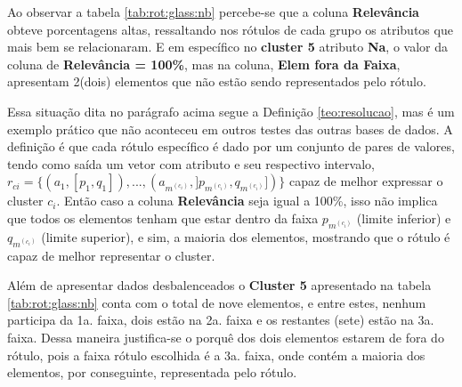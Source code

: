 Ao observar a tabela \ref{tab:rot:glass:nb} percebe-se que a coluna \textbf{Relevância} obteve porcentagens altas, ressaltando nos rótulos de cada grupo os atributos que mais bem se relacionaram. E em específico no  \textbf{cluster 5} atributo \textbf{Na}, o valor da coluna de \textbf{Relevância = 100\%}, mas na coluna, \textbf{Elem fora da Faixa}, apresentam 2(dois) elementos que não estão sendo representados pelo rótulo. 

Essa situação dita no parágrafo acima segue a Definição \ref{teo:resolucao}, mas é um exemplo prático que não aconteceu em outros testes das outras bases de dados. A definição é que cada rótulo específico é dado por um conjunto de pares de valores, tendo como saída um vetor com atributo e seu respectivo intervalo, ${ r_{ci}=\{ (a_1,[p_1,q_1]),...,(a_{m^{(c_i)}}, ]p_{m^{(c_i)}},q_{m^{(c_i)}}]) \} }$ capaz de melhor expressar o cluster ${c_i}$. Então caso a coluna \textbf{Relevância} seja igual a 100\%, isso não implica que todos os elementos tenham que estar dentro da faixa ${ p_{m^{(c_i)}} }$ (limite inferior) e ${ q_{m^{(c_i)}} }$ (limite superior), e sim, a maioria dos elementos, mostrando que o rótulo é capaz de melhor representar o cluster.

Além de apresentar dados desbalenceados o \textbf{Cluster 5} apresentado na tabela \ref{tab:rot:glass:nb} conta com o total de nove elementos, e entre estes, nenhum participa da 1a. faixa, dois estão na 2a. faixa e os restantes (sete) estão na 3a. faixa. Dessa maneira justifica-se o porquê dos dois elementos estarem de fora do rótulo, pois a faixa rótulo escolhida é a 3a. faixa, onde contém a maioria dos elementos, por conseguinte, representada pelo rótulo.

